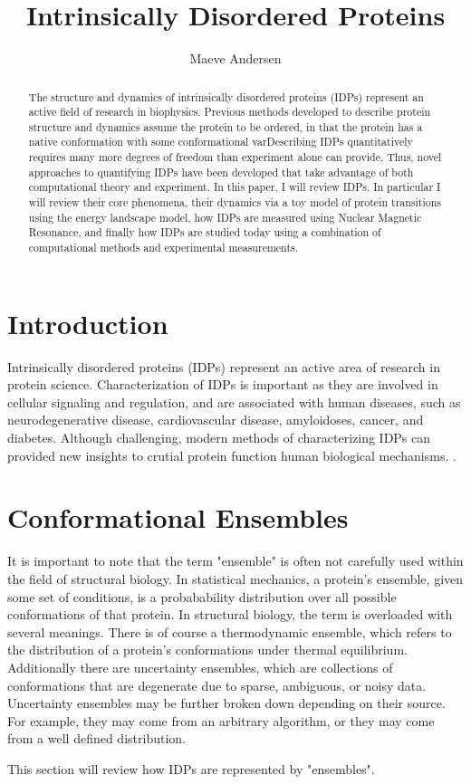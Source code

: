 \documentclass{article}
\title{Intrinsically Disordered Proteins}
\author{Maeve Andersen}
\begin{document}
\maketitle

\begin{abstract}
    The structure and dynamics of intrinsically disordered proteins (IDPs) represent an active field of research in biophysics.
    Previous methods developed to describe protein structure and dynamics assume the protein to be ordered, in that the protein has a native conformation with some conformational varDescribing IDPs quantitatively requires many more degrees of freedom than experiment alone can provide.
    Thus, novel approaches to quantifying IDPs have been developed that take advantage of both computational theory and experiment. 
 In this paper, I will review IDPs. In particular I will review their core phenomena, their dynamics via a toy model of protein transitions using the energy landscape model, how IDPs are measured using Nuclear Magnetic Resonance, and finally how IDPs are studied today using a combination of computational methods and experimental measurements.
\end{abstract}


\section{Introduction}

Intrinsically disordered proteins (IDPs) represent an active area of research in protein science.
Characterization of IDPs is important as they are involved in cellular signaling and regulation,\cite{wrightIntrinsicallyDisorderedProteins2015}
and are associated with human diseases, such as neurodegenerative disease, cardiovascular disease, amyloidoses, cancer, and diabetes.\cite{uverskyIntrinsicallyDisorderedProteins2008}
Although challenging, modern methods of characterizing IDPs can provided new insights to crutial protein function human biological mechanisms. \cite{bonomiSimultaneousDeterminationProtein2018}.

\section{Conformational Ensembles}

It is important to note that the term "ensemble" is often not carefully used within the field of structural biology.
In statistical mechanics, a protein's ensemble, given some set of conditions, is a probabability distribution over all possible conformations of that protein.
In structural biology, the term is overloaded with several meanings.\cite{gaalswykEmergingRolePhysical}
There is of course a thermodynamic ensemble, which refers to the distribution of a protein's conformations under thermal equilibrium.
Additionally there are uncertainty ensembles, which are collections of conformations that are degenerate due to sparse, ambiguous, or noisy data.
Uncertainty ensembles may be further broken down depending on their source.
For example, they may come from an arbitrary algorithm, or they may come from a well defined distribution.\cite{gaalswykEmergingRolePhysical}

This section will review how IDPs are represented by "ensembles". 



\end{document}
